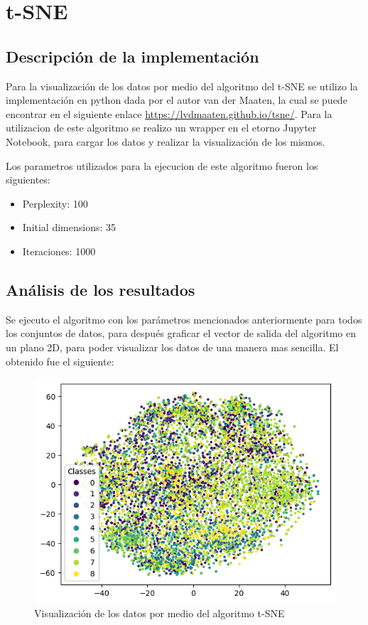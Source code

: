 \documentclass{article}
\theoremstyle{mytheoremstyle}
\theoremstyle{mytheoremstyle}
\theoremstyle{myproblemstyle}
\begin{document}
\section*{t-SNE}

\subsection*{Descripción de la implementación}

Para la visualización de los datos por medio del algoritmo del t-SNE se utilizo la implementación en python dada por el autor van der Maaten, la cual se puede encontrar en el siguiente enlace \url{https://lvdmaaten.github.io/tsne/}. Para la utilizacion de este algoritmo se realizo un wrapper en el etorno Jupyter Notebook, para cargar los datos y realizar la visualización de los mismos.

Los parametros utilizados para la ejecucion de este algoritmo fueron los siguientes:

\begin{itemize}
  \item Perplexity: 100
  \item Initial dimensions: 35
  \item Iteraciones: 1000
\end{itemize}

\subsection*{Análisis de los resultados}

Se ejecuto el algoritmo con los parámetros mencionados anteriormente para todos los conjuntos de datos, para después graficar el vector de salida del algoritmo en un plano 2D, para poder visualizar los datos de una manera mas sencilla. El obtenido fue el siguiente:

\begin{figure}[!ht]
  \centering
  \includegraphics{images/tsne.png}
  \caption{Visualización de los datos por medio del algoritmo t-SNE}
  \label{fig:tsne}
\end{figure}
\end{document}
